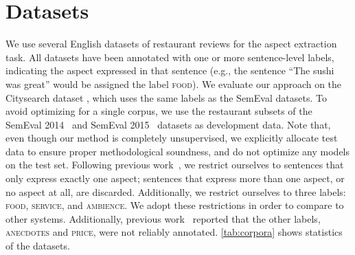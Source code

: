 \documentclass[11pt,a4paper]{article}
\begin{document}
\section{Datasets}
We use several English datasets of restaurant reviews for the aspect extraction task.
All datasets have been annotated with one or more sentence-level labels,
indicating the aspect expressed in that sentence
(e.g., the sentence ``The sushi was great'' would be assigned the label \textsc{food}).
We evaluate our approach on the Citysearch dataset \cite{ganu2009beyond}, which uses the same labels as the SemEval datasets.
To avoid optimizing for a single corpus, we use the restaurant subsets of the SemEval 2014~\citep{pontiki2014semeval} and SemEval 2015~\citep{pontiki2015semeval} datasets as development data.
Note that, even though our method is completely unsupervised, we explicitly allocate test data to ensure proper methodological soundness, and do not optimize any models on the test set.
Following previous work~\citep{he2017unsupervised, ganu2009beyond},
we restrict ourselves to sentences that only express exactly one aspect;
sentences that express more than one aspect, or no aspect at all,
are discarded.
Additionally, we restrict ourselves to three labels:
\textsc{food}, \textsc{service}, and \textsc{ambience}.
We adopt these restrictions in order to compare to other systems.
Additionally, previous work~\citep{brody2010unsupervised} reported that the other labels, \textsc{anecdotes} and \textsc{price}, were not reliably annotated.
\autoref{tab:corpora} shows statistics of the datasets.
\end{document}
